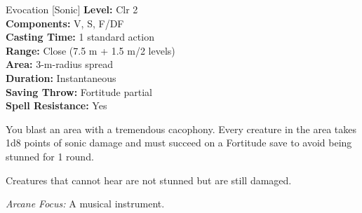 {Evocation [Sonic]}
{
	\textbf{Level:}
	Clr 2\\
	\textbf{Components:}
	V, S, F/DF\\
	\textbf{Casting Time:}
	1 standard action\\
	\textbf{Range:}
	Close (7.5 m + 1.5 m/2 levels)\\
	\textbf{Area:}
	3-m-radius spread\\
	\textbf{Duration:}
	Instantaneous\\
	\textbf{Saving Throw:}
	Fortitude partial\\
	\textbf{Spell Resistance:}
	Yes\\
}
{
	You blast an area with a tremendous cacophony. Every creature in the area takes 1d8 points of sonic damage and must succeed on a Fortitude save to avoid being stunned for 1 round.

	Creatures that cannot hear are not stunned but are still damaged.

	\textit{Arcane Focus:}
	A musical instrument.

}
